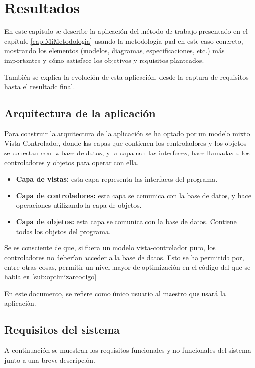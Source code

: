 \chapter{Resultados}
\label{cap:resultados}

En este capítulo se describe la aplicación del método de trabajo presentado en el capítulo \ref{cap:MiMetodologia} usando la metodología \gls{pud} en este caso concreto, mostrando los elementos (modelos, diagramas, especificaciones, etc.) más importantes y cómo satisface los objetivos y requisitos planteados.

También se explica la evolución de esta aplicación, desde la captura de requisitos hasta el resultado final.

\section{Arquitectura de la aplicación}
Para construir la arquitectura de la aplicación se ha optado por un modelo mixto Vista-Controlador, donde las capas que contienen los controladores y los objetos se conectan con la base de datos, y la capa con las interfaces, hace llamadas a los controladores y objetos para operar con ella.

\begin{itemize}
	\item \textbf{Capa de vistas:} esta capa representa las interfaces del programa.
	\item \textbf{Capa de controladores:} esta capa se comunica con la base de datos, y hace operaciones utilizando la capa de objetos.
	\item \textbf{Capa de objetos:} esta capa se comunica con la base de datos. Contiene todos los objetos del programa.
\end{itemize}

Se es consciente de que, si fuera un modelo vista-controlador puro, los controladores no deberían acceder a la base de datos. Esto se ha permitido por, entre otras cosas, permitir un nivel mayor de optimización en el código del que se habla en \ref{sub:optimizarcodigo}

En este documento, se refiere como único usuario al maestro que usará la aplicación.


\section{Requisitos del sistema}
A continuación se muestran los requisitos funcionales y no funcionales del sistema junto a una breve descripción.

